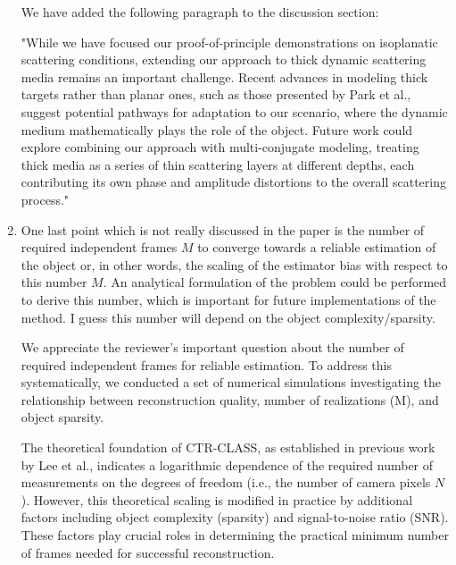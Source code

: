 \documentclass[12pt]{article}
\newenvironment{solved_reviewercomment}
    {\begin{tcolorbox}[width=\linewidth,colback=gray!5,colframe=solved_commentcolor!50,title=Reviewer Comment,left=5pt,right=5pt]}
    {\end{tcolorbox}}
\newenvironment{ourresponse}
    {\begin{tcolorbox}[width=\linewidth,breakable,enhanced,colback=gray!5,colframe=responsecolor!50,title=Response,left=5pt,right=5pt]}
    {\end{tcolorbox}}
\begin{document}
\begin{enumerate}[label=\arabic*.]
\begin{ourresponse}
        We have added the following paragraph to the discussion section:
        
        "While we have focused our proof-of-principle demonstrations on isoplanatic scattering conditions, extending our approach to thick dynamic scattering media remains an important challenge. Recent advances in modeling thick targets rather than planar ones, such as those presented by Park et al., suggest potential pathways for adaptation to our scenario, where the dynamic medium mathematically plays the role of the object. Future work could explore combining our approach with multi-conjugate modeling, treating thick media as a series of thin scattering layers at different depths, each contributing its own phase and amplitude distortions to the overall scattering process."
    \end{ourresponse}




    \item \leavevmode\vspace{-\baselineskip}
    \begin{solved_reviewercomment}
        One last point which is not really discussed in the paper is the number of required independent frames \(M\) to converge towards a reliable estimation of the object or, in other words, the scaling of the estimator bias with respect to this number \(M\). An analytical formulation of the problem could be performed to derive this number, which is important for future implementations of the method. I guess this number will depend on the object complexity/sparsity.
    \end{solved_reviewercomment}
        

    \begin{ourresponse}

        We appreciate the reviewer's important question about the number of required independent frames for reliable estimation. To address this systematically, we conducted a set of numerical simulations investigating the relationship between reconstruction quality, number of realizations (M), and object sparsity. 

        The theoretical foundation of CTR-CLASS, as established in previous work by Lee et al., indicates a logarithmic dependence of the required number of measurements on the degrees of freedom (i.e., the number of camera pixels $N$). However, this theoretical scaling is modified in practice by additional factors including object complexity (sparsity) and signal-to-noise ratio (SNR). These factors play crucial roles in determining the practical minimum number of frames needed for successful reconstruction.


\end{ourresponse}
\end{enumerate}
\end{document}

